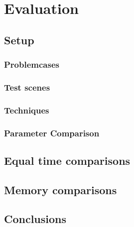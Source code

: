 \chapter{Evaluation}
\label{ch:Evaluation}

\section{Setup}

\subsection{Problemcases}


\subsection{Test scenes}


\subsection{Techniques}


\subsection{Parameter Comparison}




\label{ch:ev:photontree}


\label{ch:ev:cdftree}


\section{Equal time comparisons}

\section{Memory comparisons}

\section{Conclusions}
